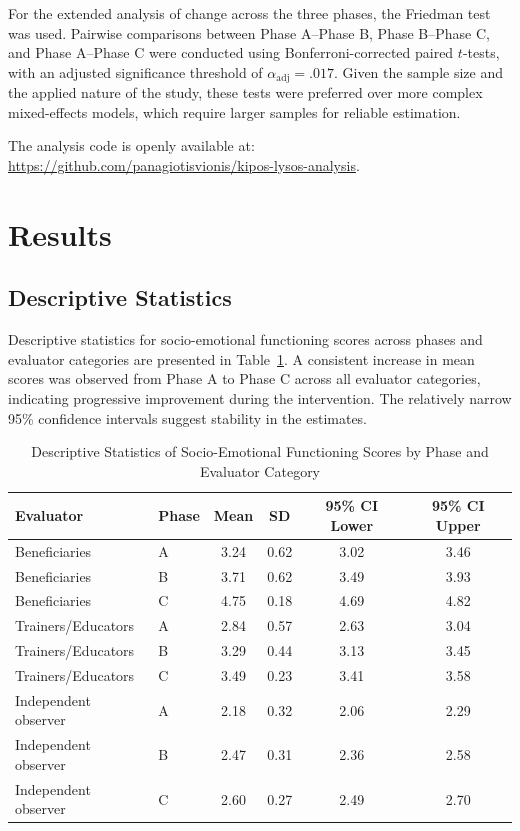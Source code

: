 \documentclass[journal]{IEEEtran}
\begin{document}
For the extended analysis of change across the three phases, the Friedman test was used. Pairwise comparisons between Phase A--Phase B, Phase B--Phase C, and Phase A--Phase C were conducted using Bonferroni-corrected paired $t$-tests, with an adjusted significance threshold of $\alpha_{\mathrm{adj}}=.017$. Given the sample size and the applied nature of the study, these tests were preferred over more complex mixed-effects models, which require larger samples for reliable estimation.

The analysis code is openly available at:
\url{https://github.com/panagiotisvionis/kipos-lysos-analysis}.


\section{Results}

\subsection{Descriptive Statistics}

Descriptive statistics for socio-emotional functioning scores across phases and evaluator categories are presented in Table~\ref{tab:descriptive_statistics}. A consistent increase in mean scores was observed from Phase A to Phase C across all evaluator categories, indicating progressive improvement during the intervention. The relatively narrow 95\% confidence intervals suggest stability in the estimates.

\begin{table}[!t]
\caption{Descriptive Statistics of Socio-Emotional Functioning Scores by Phase and Evaluator Category}
\label{tab:descriptive_statistics}
\centering
\begin{tabular}{llcccc}
\hline
\textbf{Evaluator} & \textbf{Phase} & \textbf{Mean} & \textbf{SD} & \textbf{95\% CI Lower} & \textbf{95\% CI Upper} \\
\hline
Beneficiaries & A & 3.24 & 0.62 & 3.02 & 3.46 \\
Beneficiaries & B & 3.71 & 0.62 & 3.49 & 3.93 \\
Beneficiaries & C & 4.75 & 0.18 & 4.69 & 4.82 \\
Trainers/Educators & A & 2.84 & 0.57 & 2.63 & 3.04 \\
Trainers/Educators & B & 3.29 & 0.44 & 3.13 & 3.45 \\
Trainers/Educators & C & 3.49 & 0.23 & 3.41 & 3.58 \\
Independent observer & A & 2.18 & 0.32 & 2.06 & 2.29 \\
Independent observer & B & 2.47 & 0.31 & 2.36 & 2.58 \\
Independent observer & C & 2.60 & 0.27 & 2.49 & 2.70 \\
\hline
\end{tabular}
\end{table}
\end{document}
